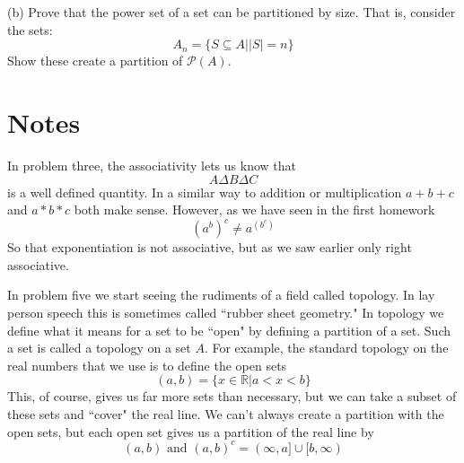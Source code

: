 \documentclass[16 pt]{amsart}
\theoremstyle{definition}
\theoremstyle{remark}
\numberwithin{equation}{subsection}
\newcommand{\R}{\mathbb{R}}
\begin{document}
(b) Prove that the power set of a set can be partitioned by size.  That is, consider the sets:
\[
A_n = \{S\subseteq A | |S|=n\}
\]
Show these create a partition of $\mathcal{P}(A)$.



\newpage 

\section{Notes}


In problem three, the associativity lets us know that
\[
A\Delta B \Delta C
\]
is a well defined quantity.  In a similar way to addition or multiplication $a+b+c$ and $a*b*c$ both make sense.  However, as we have seen in the first homework
\[
(a^b)^c \ne a^{(b^c)}
\]
So that exponentiation is not associative, but as we saw earlier only right associative.

\par In problem five we start seeing the rudiments of a field called topology.  In lay person speech this is sometimes called ``rubber sheet geometry."  In topology we define what it means for a set to be ``open" by defining a partition of a set.  Such a set is called a topology on a set $A$.  For example, the standard topology on the real numbers that we use is to define the open sets
\[
(a,b) = \{x\in\R | a<x<b\}
\]
This, of course, gives us far more sets than necessary, but we can take a subset of these sets and ``cover" the real line.  We can't always create a partition with the open sets, but each open set gives us a partition of the real line by
\[
(a,b) \text{ and } (a,b)^c = (\infty,a]\cup[b,\infty)
\]
\end{document}
